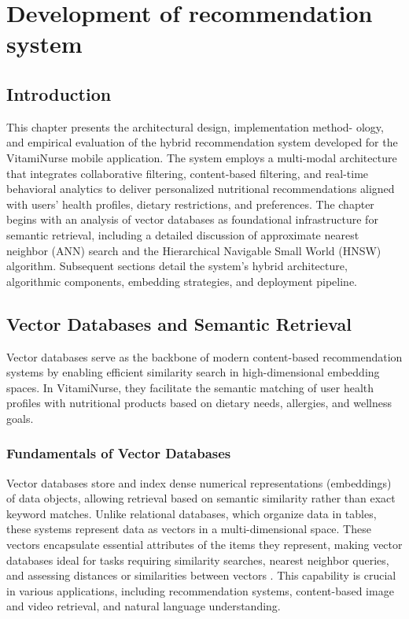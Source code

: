 \chapter{Development of recommendation system}
\section*{Introduction}
This chapter presents the architectural design, implementation method-
ology, and empirical evaluation of the hybrid recommendation system
developed for the VitamiNurse mobile application. The system employs
a multi-modal architecture that integrates collaborative filtering, content-based filtering, and real-time behavioral analytics to deliver personalized
nutritional recommendations aligned with users’ health profiles, dietary
restrictions, and preferences.
The chapter begins with an analysis of vector databases as foundational
infrastructure for semantic retrieval, including a detailed discussion of approximate nearest neighbor (ANN) search and the Hierarchical Navigable
Small World (HNSW) algorithm. Subsequent sections detail the system’s
hybrid architecture, algorithmic components, embedding strategies, and
deployment pipeline.


\section{Vector Databases and Semantic Retrieval}
Vector databases serve as the backbone of modern content-based recommendation systems by enabling efficient similarity search in high-dimensional embedding spaces. In VitamiNurse, they facilitate the semantic matching of user health profiles with nutritional products based on dietary needs, allergies, and wellness goals.

\subsection{Fundamentals of Vector Databases}
Vector databases store and index dense numerical representations (embeddings) of data objects, allowing retrieval based on semantic similarity rather than exact keyword matches. 
Unlike relational databases, which organize data in tables, these systems represent data as vectors in a multi-dimensional space. These vectors encapsulate essential attributes of the items they represent, 
making vector databases ideal for tasks requiring similarity searches, nearest neighbor queries, and assessing distances or similarities between vectors \cite{IBMVectordb2025}. 
This capability is crucial in various applications, including recommendation systems, content-based image and video retrieval, and natural language understanding.

